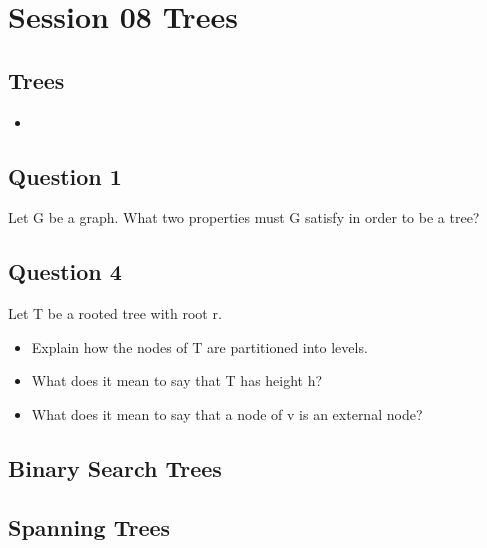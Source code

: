 \documentclass{article}
\begin{document}
\section*{Session 08 Trees}
\subsection*{Trees}
\begin{itemize}
\item 
\end{itemize}

\subsection*{Question 1}
Let G be a graph. What two properties must G satisfy in order to be a tree?

\subsection*{Question 4}
Let T be a rooted tree with root r. 

\begin{itemize}
\item Explain how the nodes of T are partitioned into levels.
\item What does it mean to say that T has height h?
\item What does it mean to say that a node of v is an external node?
\end{itemize}

\subsection*{Binary Search Trees}

\subsection*{Spanning Trees}
\end{document}
